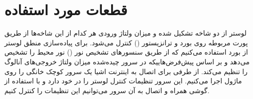 \documentclass[12pt,a4paper]{article}
\begin{document}
	\section{قطعات مورد استفاده}
	لوستر از دو شاخه  تشکیل شده و میزان ولتاژ ورودی هر کدام از این شاخه‌ها از طریق پورت مربوطه روی بورد  و ترانزیستور () کنترل می‌شود. برای پیاده‌سازی منطق لوستر از بورد  استفاده می‌کنیم که از طریق سنسور‌های تشخیص نور () نور محیط را تشخیص می‌دهد و بر اساس پیش‌فرض‌هاییکه در سرور  چیده‌شده میزان ولتاژ خروجی‌های آنالوگ را تنظیم می‌کند. از طرفی برای اتصال به اینترنت اشیا یک سرور کوچک خانگی را روی ماژول  اجرا می‌کنیم. این سرور تنظیمات کنترل لوستر را در خود دارد و با استفاده از گوشی همراه و اتصال به آن سرور می‌توانیم این تنظیمات را کنترل کنیم.
	
\end{document}
